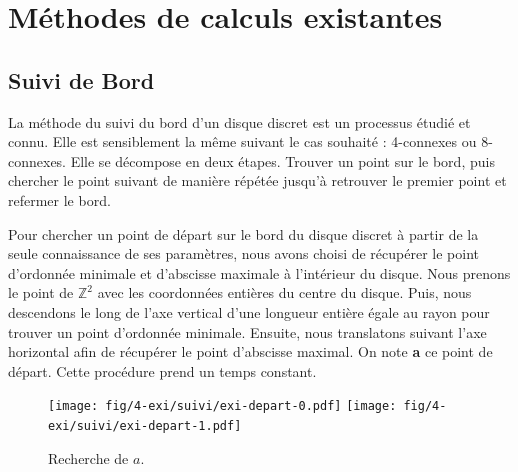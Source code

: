 \section{Méthodes de calculs existantes}

\subsection{Suivi de Bord}

La méthode du suivi du bord d'un disque discret est un processus étudié et connu. Elle est sensiblement la même suivant le cas souhaité : 4-connexes ou 8-connexes. Elle se décompose en deux étapes. Trouver un point sur le bord, puis chercher le point suivant de manière répétée jusqu'à retrouver le premier point et refermer le bord.


Pour chercher un point de départ sur le bord du disque discret à partir de la seule connaissance de ses paramètres, nous avons choisi de récupérer le point d'ordonnée minimale et d'abscisse maximale à l'intérieur du disque. Nous prenons le point de $\mathbb{Z}^2$ avec les coordonnées entières du centre du disque. Puis, nous descendons le long de l'axe vertical d'une longueur entière égale au rayon pour trouver un point d'ordonnée minimale. Ensuite, nous translatons suivant l'axe horizontal afin de récupérer le point d'abscisse maximal. On note \textbf{a} ce point de départ. Cette procédure prend un temps constant. 

\begin{figure}[H]
  \centering
  \texttt{[image: fig/4-exi/suivi/exi-depart-0.pdf]}
  \texttt{[image: fig/4-exi/suivi/exi-depart-1.pdf]}
  \caption{Recherche de $a$.}
\end{figure}
  


